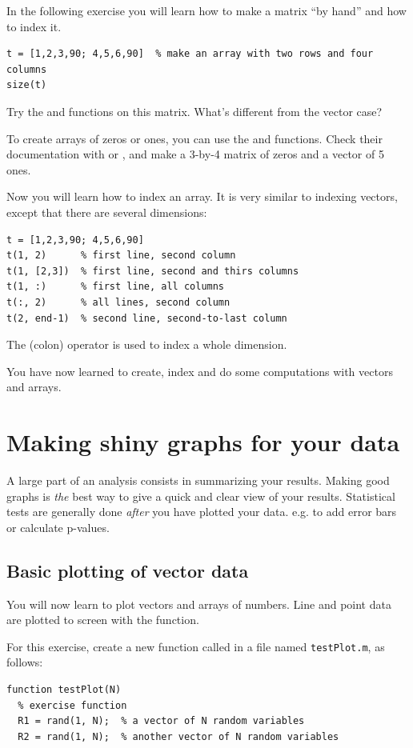 \documentclass{article}
\begin{document}
In the following exercise you will learn how to make a matrix ``by hand'' and how to index it.
\begin{lstlisting}
t = [1,2,3,90; 4,5,6,90]  % make an array with two rows and four columns
size(t)
\end{lstlisting}

Try the  and  functions on this matrix.
What's different from the vector case?

To create arrays of zeros or ones, you can use the  and  functions.
Check their documentation with  or , and make a 3-by-4 matrix of zeros and a vector of 5 ones.

Now you will learn how to index an array.
It is very similar to indexing vectors, except that there are several dimensions:
\begin{lstlisting}
t = [1,2,3,90; 4,5,6,90]
t(1, 2)      % first line, second column
t(1, [2,3])  % first line, second and thirs columns
t(1, :)      % first line, all columns
t(:, 2)      % all lines, second column
t(2, end-1)  % second line, second-to-last column
\end{lstlisting}
The \mcode{:} (colon) operator is used to index a whole dimension.

You have now learned to create, index and do some computations with vectors and arrays.


\pagebreak
\section{Making shiny graphs for your data}

A large part of an analysis consists in summarizing your results.
Making good graphs is \emph{the} best way to give a quick and clear view of your results.
Statistical tests are generally done \emph{after} you have plotted your data. e.g. to add error bars or calculate p-values.


\subsection{Basic plotting of vector data}

You will now learn to plot vectors and arrays of numbers.
Line and point data are plotted to screen with the  function.

For this exercise, create a new function called  in a file named \texttt{testPlot.m}, as follows:
\begin{lstlisting}
function testPlot(N)
  % exercise function
  R1 = rand(1, N);  % a vector of N random variables
  R2 = rand(1, N);  % another vector of N random variables
\end{lstlisting}
\end{document}
